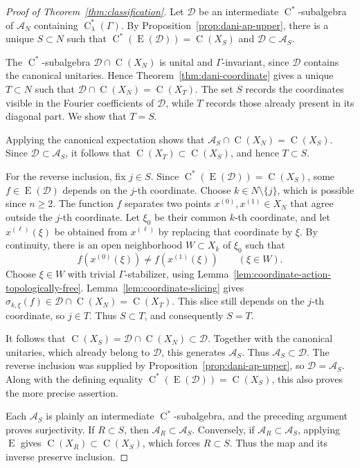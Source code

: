 \documentclass[11pt]{amsart}
\numberwithin{equation}{section}
\newcommand{\rC}{\operatorname{C}}
\newcommand{\rE}{\operatorname{E}}
\theoremstyle{definition}
\begin{document}
	\begin{proof}[Proof of Theorem~\ref{thm:classification}]
		Let \(\mathcal D\) be an intermediate \(\rC^*\)-subalgebra of \(\mathcal A_N\) containing \(\rC^*_\lambda(\Gamma)\). By Proposition~\ref{prop:dani-ap-upper}, there is a unique \(S\subset N\) such that \(\rC^*(\rE(\mathcal D))=\rC(X_S)\) and \(\mathcal D\subset\mathcal A_S\).
		
		The \(\rC^*\)-subalgebra \(\mathcal D\cap\rC(X_N)\) is unital and \(\Gamma\)-invariant, since \(\mathcal D\) contains the canonical unitaries. Hence Theorem~\ref{thm:dani-coordinate} gives a unique \(T\subset N\) such that \(\mathcal D\cap\rC(X_N)=\rC(X_T)\).
		The set \(S\) records the coordinates visible in the Fourier coefficients of \(\mathcal D\), while \(T\) records those already present in its diagonal part. We show that \(T=S\).
		
		Applying the canonical expectation shows that \(\mathcal A_S\cap\rC(X_N)=\rC(X_S)\). Since \(\mathcal D\subset\mathcal A_S\), it follows that \(\rC(X_T)\subset\rC(X_S)\), and hence \(T\subset S\).
		
		For the reverse inclusion, fix \(j\in S\). Since \(\rC^*(\rE(\mathcal D))=\rC(X_S)\), some \(f\in\rE(\mathcal D)\) depends on the \(j\)-th coordinate. Choose \(k\in N\setminus\{j\}\), which is possible since \(n\geq2\). The function \(f\) separates two points \(x^{(0)},x^{(1)}\in X_N\) that agree outside the \(j\)-th coordinate. Let \(\xi_0\) be their common \(k\)-th coordinate, and let \(x^{(\ell)}(\xi)\) be obtained from \(x^{(\ell)}\) by replacing that coordinate by \(\xi\). By continuity, there is an open neighborhood \(W\subset X_k\) of \(\xi_0\) such that
		\[
		f(x^{(0)}(\xi))\neq f(x^{(1)}(\xi))
		\qquad(\xi\in W).
		\]
		Choose \(\xi\in W\) with trivial \(\Gamma\)-stabilizer, using Lemma~\ref{lem:coordinate-action-topologically-free}. Lemma~\ref{lem:coordinate-slicing} gives \(\sigma_{k,\xi}(f)\in\mathcal D\cap\rC(X_N)=\rC(X_T)\). This slice still depends on the \(j\)-th coordinate, so \(j\in T\). Thus \(S\subset T\), and consequently \(S=T\).
		
		It follows that \(\rC(X_S)=\mathcal D\cap\rC(X_N)\subset\mathcal D\). Together with the canonical unitaries, which already belong to \(\mathcal D\), this generates \(\mathcal A_S\). Thus \(\mathcal A_S\subset\mathcal D\). The reverse inclusion was supplied by Proposition~\ref{prop:dani-ap-upper}, so \(\mathcal D=\mathcal A_S\). Along with the defining equality
		\(\rC^*(\rE(\mathcal D))=\rC(X_S)\), this also proves the more precise assertion.
		
		Each \(\mathcal A_S\) is plainly an intermediate \(\rC^*\)-subalgebra, and the preceding argument proves surjectivity. If \(R\subset S\), then \(\mathcal A_R\subset\mathcal A_S\). Conversely, if \(\mathcal A_R\subset\mathcal A_S\), applying \(\rE\) gives \(\rC(X_R)\subset\rC(X_S)\), which forces \(R\subset S\). Thus the map and its inverse preserve inclusion.
	\end{proof}
	
\end{document}
